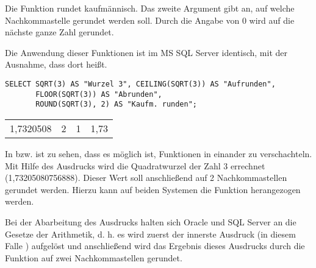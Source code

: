 \begin{merke}
    Die Funktion  rundet kaufmännisch. Das zweite
    Argument gibt an, auf welche Nachkommastelle gerundet werden soll.
    Durch die Angabe von 0 wird auf die nächste ganze Zahl gerundet.
\end{merke}
Die Anwendung dieser Funktionen ist im MS SQL Server identisch, mit der
Ausnahme, dass  dort 
heißt.
\begin{lstlisting}[language=ms_sql,caption={Rundungsfunktionen in MS SQL},label=sql03_16]
SELECT SQRT(3) AS "Wurzel 3", CEILING(SQRT(3)) AS "Aufrunden",
       FLOOR(SQRT(3)) AS "Abrunden",
       ROUND(SQRT(3), 2) AS "Kaufm. runden";
        \end{lstlisting}
\begin{center}
    \begin{small}
        \tablehead{}

        \begin{mssql}
            \begin{supertabular}{llll}
                1,7320508 & 2 & 1 & 1,73 \\
            \end{supertabular}
        \end{mssql}
    \end{small}
\end{center}
In  bzw.  ist zu sehen, dass es
möglich ist, Funktionen in einander zu verschachteln. Mit Hilfe des
Ausdrucks  wird die Quadratwurzel der Zahl 3
errechnet (1,73205080756888). Dieser Wert soll anschließend auf 2
Nachkommastellen gerundet werden. Hierzu kann auf beiden Systemen die
Funktion  herangezogen werden.

Bei der Abarbeitung des Ausdrucks 
halten sich Oracle und SQL Server an die Gesetze der Arithmetik, d. h.
es wird zuerst der innerste Ausdruck (in diesem Falle
) aufgelöst und anschließend wird das
Ergebnis dieses Ausdrucks durch die Funktion  auf
zwei Nachkommastellen gerundet.

